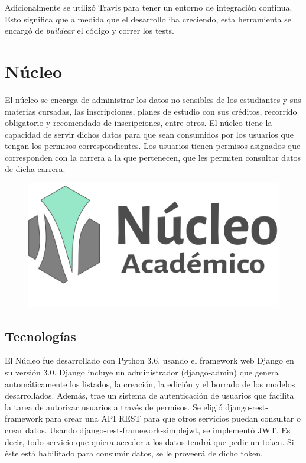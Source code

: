 Adicionalmente se utilizó Travis para tener un entorno de integración continua. Esto significa que a medida que el desarrollo iba creciendo, esta herramienta se encargó de \textit{buildear} el código y correr los tests.  

\section[Núcleo]{Núcleo}

El núcleo se encarga de administrar los datos no sensibles de los estudiantes y sus materias cursadas, las inscripciones, planes de estudio con sus créditos, recorrido obligatorio y recomendado de inscripciones, entre otros.
El núcleo tiene la capacidad de servir dichos datos para que sean consumidos por los usuarios que tengan los permisos correspondientes.
Los usuarios tienen permisos asignados que corresponden con la carrera a la que pertenecen, que les permiten consultar datos de dicha carrera. 


\begin{figure}[h!]
  \centering
    \includegraphics[scale=0.5]{images/nucleo/nucleo-fondoblanco.png}
  \label{fig:django}
\end{figure}

\subsection{Tecnologías}

El Núcleo fue desarrollado con Python 3.6, usando el framework web Django en su versión 3.0.
Django incluye un administrador (django-admin) que genera automáticamente los listados, la creación, la edición y el borrado de los modelos desarrollados. Además, trae un sistema de autenticación de usuarios que facilita la tarea de autorizar usuarios a través de permisos.
Se eligió django-rest-framework para crear una API REST para que otros servicios puedan consultar o crear datos.
Usando django-rest-framework-simplejwt, se implementó JWT. Es decir, todo servicio que quiera acceder a los datos tendrá que pedir un token. Si éste está habilitado para consumir datos, se le proveerá de dicho token.

